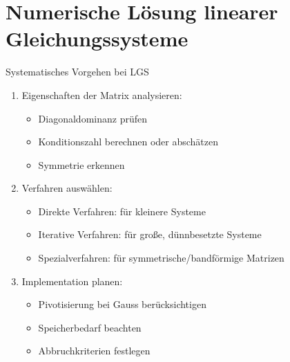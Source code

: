 

\section{Numerische Lösung linearer Gleichungssysteme}

\begin{KR}{Systematisches Vorgehen bei LGS}
\begin{enumerate}
    \item Eigenschaften der Matrix analysieren:
    \begin{itemize}
        \item Diagonaldominanz prüfen
        \item Konditionszahl berechnen oder abschätzen
        \item Symmetrie erkennen
    \end{itemize}
    
    \item Verfahren auswählen:
    \begin{itemize}
        \item Direkte Verfahren: für kleinere Systeme
        \item Iterative Verfahren: für große, dünnbesetzte Systeme
        \item Spezialverfahren: für symmetrische/bandförmige Matrizen
    \end{itemize}
    
    \item Implementation planen:
    \begin{itemize}
        \item Pivotisierung bei Gauss berücksichtigen
        \item Speicherbedarf beachten
        \item Abbruchkriterien festlegen
    \end{itemize}
\end{enumerate}
\end{KR}

